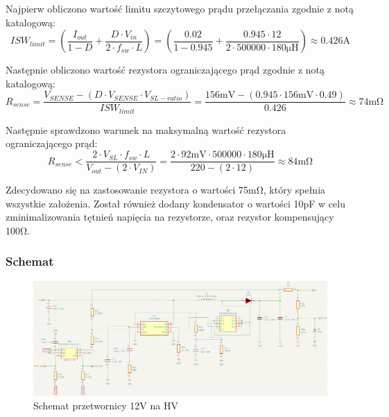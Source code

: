 \documentclass[../../main.tex]{subfiles}
\begin{document}
Najpierw obliczono wartość limitu szczytowego prądu przełączania zgodnie z notą katalogową:
\begin{equation}
    ISW_{limit} = \left(\frac{I_{out}}{1-D}+\frac{D \cdot V_{in}}{2 \cdot f_{sw} \cdot L}\right) = \left(\frac{0.02}{1-0.945}+\frac{0.945 \cdot 12}{2 \cdot 500000 \cdot 180\si{\micro\henry}}\right) \approx 0.426\si{\ampere}
\end{equation}

Następnie obliczono wartość rezystora ograniczającego prąd zgodnie z notą katalogową:
\begin{equation}
    R_{sense} = \frac{V_{SENSE} - (D \cdot V_{SENSE} \cdot V_{SL-ratio})}{ISW_{limit}} = \frac{156\si{\milli\volt} - (0.945 \cdot 156\si{\milli\volt} \cdot 0.49)}{0.426} \approx 74\si{\milli\ohm}
\end{equation}

Następnie sprawdzono warunek na maksymalną wartość rezystora ograniczającego prąd:
\begin{equation}
    R_{sense} < \frac{2 \cdot V_{SL} \cdot f_{sw} \cdot L}{V_{out} - (2 \cdot V_{IN})} = \frac{2 \cdot 92\si{\milli\volt} \cdot 500000 \cdot 180\si{\micro\henry}}{220 - (2 \cdot 12)} \approx 84\si{\milli\ohm}
\end{equation}

Zdecydowano się na zastosowanie rezystora o wartości 75\si{\milli\ohm}, który spełnia wszystkie założenia.
Został również dodany kondensator o wartości 10\si{\pico\farad} w celu zminimalizowania tętnień napięcia na rezystorze,
oraz rezystor kompensujący 100\si{\ohm}.
\subsubsection{Schemat}
\begin{figure}[H]
    \centering
    \includegraphics[width=1.1\textwidth]{schemat.png}
    \caption{Schemat przetwornicy 12V na HV}
\end{figure}
\end{document}
